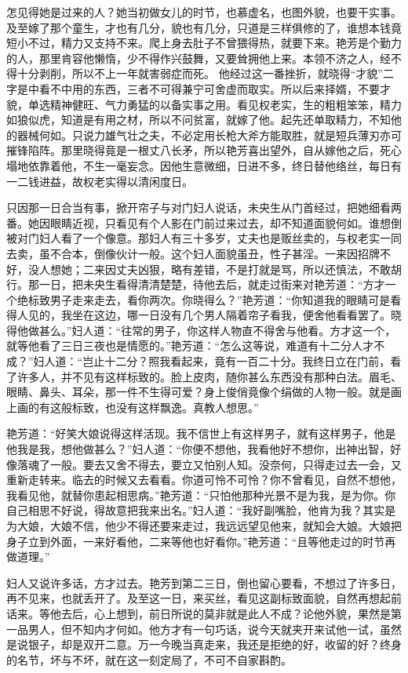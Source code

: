 \documentclass[a4paper,12pt,UTF8,twoside]{ctexbook}
\begin{document}
怎见得她是过来的人？她当初做女儿的时节，也慕虚名，也图外貌，也要干实事。及至嫁了那个童生，才也有几分，貌也有几分，只道是三样俱修的了，谁想本钱竟短小不过，精力又支持不来。爬上身去肚子不曾猥得热，就要下来。艳芳是个勤力的人，那里肯容他懒惰，少不得作兴鼓舞，又要耸拥他上来。本领不济之人，经不得十分剥削，所以不上一年就害弱症而死。 他经过这一番挫折，就晓得“才貌”二字是中看不中用的东西，三者不可得兼宁可舍虚而取实。所以后来择婿，不要才貌，单选精神健旺、气力勇猛的以备实事之用。看见权老实，生的粗粗笨笨，精力如狼似虎，知道是有用之材，所以不问贫富，就嫁了他。起先还单取精力，不知他的器械何如。只说力雄气壮之夫，不必定用长枪大斧方能取胜，就是短兵薄刃亦可摧锋陷阵。那里晓得竟是一根丈八长矛，所以艳芳喜出望外，自从嫁他之后，死心塌地依靠着他，不生一毫妄念。因他生意微细，日进不多，终日替他络丝，每日有一二钱进益，故权老实得以清闲度日。

只因那一日合当有事，掀开帘子与对门妇人说话，未央生从门首经过，把她细看两番。她因眼睛近视，只看见有个人影在门前过来过去，却不知道面貌何如。谁想倒被对门妇人看了一个像意。那妇人有三十多岁，丈夫也是贩丝卖的，与权老实一同去卖，虽不合本，倒像伙计一般。这个妇人面貌虽丑，性子甚淫。一来因招牌不好，没人想她；二来因丈夫凶狠，略有差错，不是打就是骂，所以还慎法，不敢胡行。那一日，把未央生看得清清楚楚，待他去后，就走过街来对艳芳道：“方才一个绝标致男子走来走去，看你两次。你晓得么？”艳芳道：“你知道我的眼睛可是看得人见的，我坐在这边，哪一日没有几个男人隔着帘子看我，便舍他看看罢了。晓得他做甚么。”妇人道：“往常的男子，你这样人物直不得舍与他看。方才这一个，就等他看了三日三夜也是情愿的。”艳芳道：“怎么这等说，难道有十二分人才不成？”妇人道：“岂止十二分？照我看起来，竟有一百二十分。我终日立在门前，看了许多人，并不见有这样标致的。脸上皮肉，随你甚么东西没有那种白法。眉毛、眼睛、鼻头、耳朵，那一件不生得可爱？身上俊俏竟像个绢做的人物一般。就是画上画的有这般标致，也没有这样飘逸。真教人想思。”

艳芳道：“好笑大娘说得这样活现。我不信世上有这样男子，就有这样男子，他是他我是我，想他做甚么？”妇人道：“你便不想他，我看他好不想你，出神出智，好像落魂了一般。要去又舍不得去，要立又怕别人知。没奈何，只得走过去一会，又重新走转来。临去的时候又去看看。你道可怜不可怜？你不曾看见，自然不想他，我看见他，就替你患起相思病。”艳芳道：“只怕他那种光景不是为我，是为你。你自己相思不好说，得故意把我来出名。”妇人道：“我好副嘴脸，他肯为我？其实是为大娘，大娘不信，他少不得还要来走过，我远远望见他来，就知会大娘。大娘把身子立到外面，一来好看他，二来等他也好看你。”艳芳道：“且等他走过的时节再做道理。”

妇人又说许多话，方才过去。艳芳到第二三日，倒也留心要看，不想过了许多日，再不见来，也就丢开了。及至这一日，来买丝，看见这副标致面貌，自然再想起前话来。等他去后，心上想到，前日所说的莫非就是此人不成？论他外貌，果然是第一品男人，但不知内才何如。他方才有一句巧话，说今天就夹开来试他一试，虽然是说银子，却是双开二意。万一今晚当真走来，我还是拒绝的好，收留的好？终身的名节，坏与不坏，就在这一刻定局了，不可不自家斟酌。
\end{document}
